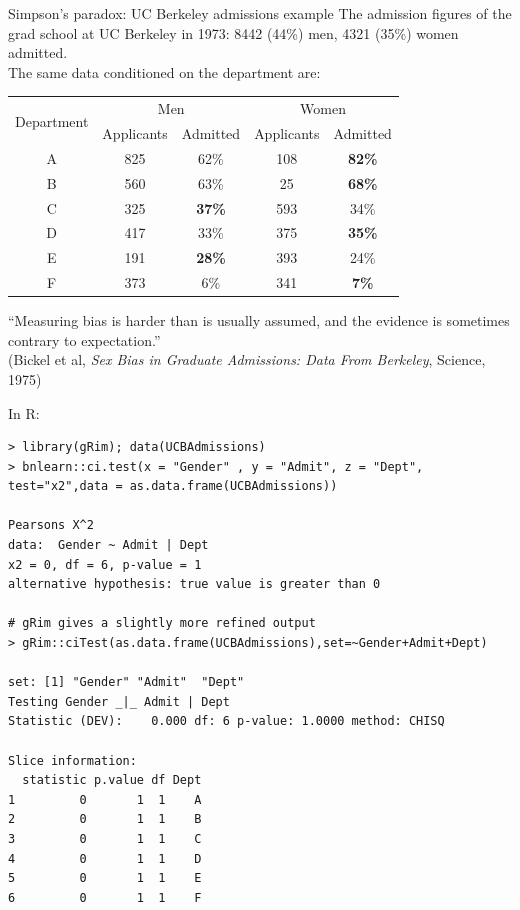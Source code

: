 \documentclass[11pt,handout,aspectratio=169,dvipsnames]{beamer}
\begin{document}
\begin{frame}[label=SP]{Simpson's paradox: UC Berkeley admissions example}
		The admission figures of the grad school at UC Berkeley in 1973: 8442 (44\%) men, 4321 (35\%) women admitted.\\[.3cm] The same data conditioned on the department are:\\[.3cm]
\hspace{.7cm}\begin{tabular}{|c|c|c|c|c|}
\hline
\multirow{2}{*}{Department} & \multicolumn{2}{c|}{Men}   & \multicolumn{2}{c|}{Women} \\ \cline{2-5} 
                            & Applicants & Admitted       & Applicants & Admitted       \\ \hline
A                           & 825        & 62\%          & 108        & \textbf{82\%} \\ \hline
B                           & 560        & 63\%          & 25         & \textbf{68\%} \\ \hline
C                           & 325        & \textbf{37\%} & 593        & 34\%          \\ \hline
D                           & 417        & 33\%          & 375        & \textbf{35\%} \\ \hline
E                           & 191        & \textbf{28\%} & 393        & 24\%          \\ \hline
F                           & 373        & 6\%           & 341        & \textbf{7\%}  \\ \hline
\end{tabular}
\medskip

``Measuring bias is harder than is usually assumed, and the evidence is sometimes contrary to expectation.''\\[.3cm] \tiny(Bickel et al,  \textit{Sex Bias in Graduate Admissions: Data From Berkeley}, Science, 1975) 
\end{frame}

\begin{frame}[fragile]{}
	In R:
	\begin{lstlisting}
> library(gRim); data(UCBAdmissions)
> bnlearn::ci.test(x = "Gender" , y = "Admit", z = "Dept", test="x2",data = as.data.frame(UCBAdmissions))

Pearsons X^2
data:  Gender ~ Admit | Dept
x2 = 0, df = 6, p-value = 1
alternative hypothesis: true value is greater than 0

# gRim gives a slightly more refined output
> gRim::ciTest(as.data.frame(UCBAdmissions),set=~Gender+Admit+Dept)

set: [1] "Gender" "Admit"  "Dept"  
Testing Gender _|_ Admit | Dept 
Statistic (DEV):    0.000 df: 6 p-value: 1.0000 method: CHISQ

Slice information:
  statistic p.value df Dept
1         0       1  1    A
2         0       1  1    B
3         0       1  1    C
4         0       1  1    D
5         0       1  1    E
6         0       1  1    F
 \end{lstlisting}
\end{frame}
\end{document}
